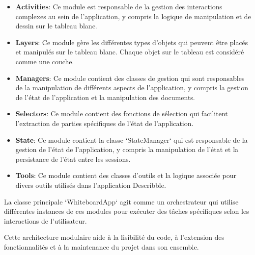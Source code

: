 \begin{itemize}
    \item \textbf{Activities}: Ce module est responsable de la gestion des interactions complexes au sein de l'application, y compris la logique de manipulation et de dessin sur le tableau blanc.

    \item \textbf{Layers}: Ce module gère les différentes types d'objets qui peuvent être placés et manipulés sur le tableau blanc. Chaque objet sur le tableau est considéré comme une couche.

    \item \textbf{Managers}: Ce module contient des classes de gestion qui sont responsables de la manipulation de différents aspects de l'application, y compris la gestion de l'état de l'application et la manipulation des documents.

    \item \textbf{Selectors}: Ce module contient des fonctions de sélection qui facilitent l'extraction de parties spécifiques de l'état de l'application.

    \item \textbf{State}: Ce module contient la classe `StateManager` qui est responsable de la gestion de l'état de l'application, y compris la manipulation de l'état et la persistance de l'état entre les sessions.

    \item \textbf{Tools}: Ce module contient des classes d'outils et la logique associée pour divers outils utilisés dans l'application Describble.
\end{itemize}

La classe principale `WhiteboardApp` agit comme un orchestrateur qui utilise différentes instances de ces modules pour exécuter des tâches spécifiques selon les interactions de l'utilisateur.

Cette architecture modulaire aide à la lisibilité du code, à l'extension des fonctionnalités et à la maintenance du projet dans son ensemble.